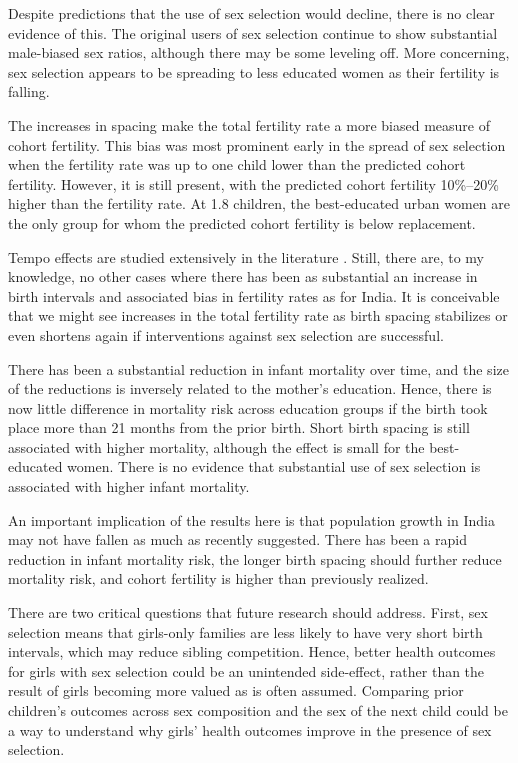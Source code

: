 \documentclass[12pt,letterpaper]{article}
\begin{document}
Despite predictions that the use of sex selection would decline, there is no clear 
evidence of this. 
The original users of sex selection continue to show substantial male-biased sex ratios, 
although there may be some leveling off. 
More concerning, sex selection appears to be spreading to less educated women as their 
fertility is falling.




The increases in spacing make the total fertility rate a more biased measure of cohort 
fertility. 
This bias was most prominent early in the spread of sex selection when the fertility rate 
was up to one child lower than the predicted cohort fertility. 
However, it is still present, with the predicted cohort fertility 10\%--20\% 
higher than the fertility rate. 
At 1.8 children, the best-educated urban women are the only group for whom the predicted 
cohort fertility is below replacement.

Tempo effects are studied extensively in the literature \citep[see, for example, ][]{Bongaarts1999}.
Still, there are, to my knowledge, no other cases where there has been as 
substantial an increase in birth intervals and associated bias in fertility rates 
as for India.
It is conceivable that we might see increases in the total fertility rate as birth spacing 
stabilizes or even shortens again if interventions against sex selection are successful.


There has been a substantial reduction in infant mortality over time, and the size of the 
reductions is inversely related to the mother's education.
Hence, there is now little difference in mortality risk across education groups if the 
birth took place more than 21 months from the prior birth.
Short birth spacing is still associated with higher mortality, although the effect is 
small for the best-educated women.
There is no evidence that substantial use of sex selection is associated with higher 
infant mortality. 


An important implication of the results here is that population growth in India may
not have fallen as much as recently suggested.
There has been a rapid reduction in infant mortality risk, the longer birth spacing should 
further reduce mortality risk, and cohort fertility is higher than previously realized.



There are two critical questions that future research should address.
First, sex selection means that girls-only families are less likely to have
very short birth intervals, which may reduce sibling competition. 
Hence, better health outcomes for girls with sex selection could be an unintended 
side-effect, rather than the result of girls becoming more valued as is often assumed. 
Comparing prior children's outcomes across sex composition and the sex of the next child 
could be a way to understand why girls' health outcomes improve in the presence of sex selection.
\end{document}
